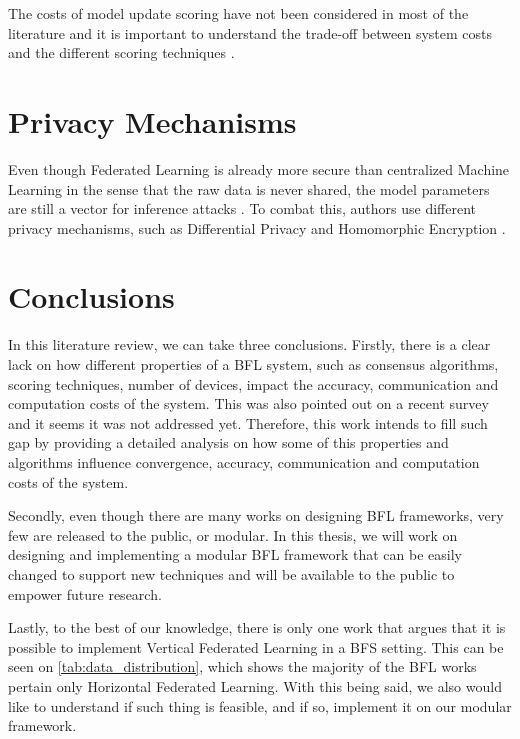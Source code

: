 The costs of model update scoring have not been considered in most of the literature and it is important to understand the trade-off between system costs and the different scoring techniques \cite{9403374, 10.48550/arxiv.2110.02182}.

\section{Privacy Mechanisms}

Even though Federated Learning is already more secure than centralized Machine Learning in the sense that the raw data is never shared, the model parameters are still a vector for inference attacks \cite{10.1145/3298981}. To combat this, authors use different privacy mechanisms, such as Differential Privacy \cite{10.48550/arxiv.2007.03856, Peyvandi2022, 9170559} and Homomorphic Encryption \cite{8945913, 8894364}.

\section{Conclusions}

In this literature review, we can take three conclusions. Firstly, there is a clear lack on how different properties of a BFL system, such as consensus algorithms, scoring techniques, number of devices, impact the accuracy, communication and computation costs of the system. This was also pointed out on a recent survey \cite{9403374} and it seems it was not addressed yet. Therefore, this work intends to fill such gap by providing a detailed analysis on how some of this properties and algorithms influence convergence, accuracy, communication and computation costs of the system.

Secondly, even though there are many works on designing BFL frameworks, very few are released to the public, or modular. In this thesis, we will work on designing and implementing a modular BFL framework that can be easily changed to support new techniques and will be available to the public to empower future research.

Lastly, to the best of our knowledge, there is only one work that argues that it is possible to implement Vertical Federated Learning in a BFS setting. This can be seen on \autoref{tab:data_distribution}, which shows the majority of the BFL works pertain only Horizontal Federated Learning. With this being said, we also would like to understand if such thing is feasible, and if so, implement it on our modular framework.




